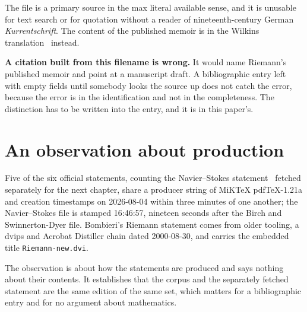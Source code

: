 The file is a primary source in the max literal available sense, and it is unusable for text search
or for quotation without a reader of nineteenth-century German \emph{Kurrentschrift}. The content of
the published memoir is in the Wilkins translation~\cite{src:Wilkins-1998} instead.

\textbf{A citation built from this filename is wrong.} It would name Riemann's published memoir and
point at a manuscript draft. A bibliographic entry left with empty fields until somebody looks the
source up does not catch the error, because the error is in the identification and not in the
completeness. The distinction has to be written into the entry, and it is in this paper's.

\section{An observation about production}

Five of the six official statements, counting the Navier--Stokes statement~\cite{src:Fefferman}
fetched separately for the next chapter, share a producer string of MiKTeX pdfTeX-1.21a and creation
timestamps on 2026-08-04 within three minutes of one another; the Navier--Stokes file is stamped
16:46:57, nineteen seconds after the Birch and Swinnerton-Dyer file. Bombieri's Riemann statement
comes from older tooling, a dvips and Acrobat Distiller chain dated 2000-08-30, and carries the
embedded title \texttt{Riemann-new.dvi}.

The observation is about how the statements are produced and says nothing about their contents. It
establishes that the corpus and the separately fetched statement are the same edition of the same
set, which matters for a bibliographic entry and for no argument about mathematics.

